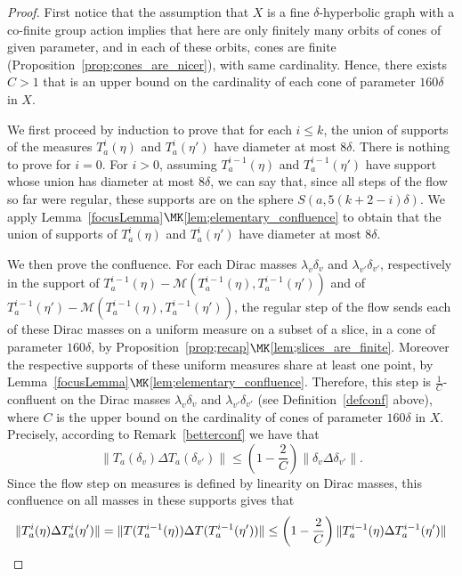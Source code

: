 \begin{proof}
First notice that the assumption that $X$ is a fine $\delta$-hyperbolic graph with a co-finite group action implies that here are only finitely many orbits of cones of given parameter, and in each of these orbits, cones are finite (Proposition~\ref{prop;cones_are_nicer}), with same cardinality. Hence, there exists $C>1$ that is an upper bound on the cardinality of each cone of parameter $160\delta$ in $X$.

We first proceed by induction to prove that for each $i\leq k$, the union of supports of the measures $T^i_a(\eta)$ and $T^i_a(\eta')$ have diameter at most $8\delta$. There is nothing to prove for $i=0$. For $i>0$, assuming $T^{i-1}_a(\eta)$ and $T^{i-1}_a(\eta')$ have support whose union has diameter at most $8\delta$, we can say that, since all steps of the flow so far were regular, these supports are on the sphere $S(a, 5 (k+2-i)\delta)$. We apply Lemma~\ref{focusLemma}$\MK$\eqref{lem;elementary_confluence} to obtain that the union of supports of $T^{i}_a(\eta)$ and $T^{i}_a(\eta')$ have diameter at most $8\delta$.

We then prove the confluence. For each Dirac masses $\lambda_v\delta_v$ and $\lambda_{v'}\delta_{v'}$, respectively in the support of $T^{i-1}_a(\eta) - \mathscr{M} (T^{i-1}_a (\eta), T^{i-1}_a(\eta')) $ and of $T^{i-1}_a(\eta')- \mathscr{M} (T^{i-1}_a (\eta), T^{i-1}_a(\eta')) $, the regular step of the flow sends each of these Dirac masses on a uniform measure on a subset of a slice, in a cone of parameter $160\delta$, by Proposition~\ref{prop;recap}$\MK$\eqref{lem;slices_are_finite}. Moreover the respective supports of these uniform measures share at least one point, by Lemma~\ref{focusLemma}$\MK$\eqref{lem;elementary_confluence}. Therefore, this step is $\frac{1}{C}$-confluent on the Dirac masses $\lambda_v\delta_v$ and $\lambda_{v'}\delta_{v'}$ (see Definition~\ref{defconf} above), where $C$ is the upper bound on the cardinality of cones of parameter $160\delta$ in $X$. Precisely, according to Remark~\ref{betterconf} we have that
\[
\| T_a(\delta_v) \Delta T_a(\delta_{v'}) \| \leq \left(1- \frac{2}{C}\right) \|\delta_v \Delta\delta_{v'} \|.
\]
Since the flow step on measures is defined by linearity on Dirac masses, this confluence on all masses in these supports gives that
\[
\|T^{i}_a(\eta) \Delta T^{i}_a(\eta')\| = \|T(T^{i-1}_a(\eta)) \Delta T(T^{i-1}_a(\eta'))\| \leq \left(1-\frac{2}{C}\right) \| T^{i-1}_a(\eta)
\Delta T^{i-1}_a(\eta') \|\qedhere
\]
\end{proof}

